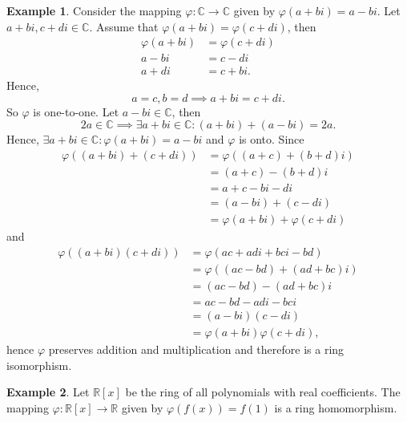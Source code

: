 \documentclass{article}
\theoremstyle{definition}
\newtheorem{example}{Example}[section]
\begin{document}
\begin{example}
    Consider the mapping $\varphi:\mathbb{C}\to\mathbb{C}$ given by $\varphi(a+bi)=a-bi$. Let $a+bi,c+di\in\mathbb{C}$. Assume that $\varphi(a+bi)=\varphi(c+di)$, then
    \begin{align*}
        \varphi(a+bi)&=\varphi(c+di)\\
        a-bi&=c-di\\
        a+di&=c+bi.
    \end{align*}
    Hence,
    \begin{equation*}
        a=c,b=d \implies a+bi=c+di.
    \end{equation*}
    So $\varphi$ is one-to-one. Let $a-bi\in\mathbb{C}$, then 
    \begin{equation*}
        2a\in\mathbb{C} \implies \exists a+bi\in\mathbb{C}:(a+bi)+(a-bi)=2a.
    \end{equation*}
    Hence, $\exists a+bi\in\mathbb{C}:\varphi(a+bi)=a-bi$ and $\varphi$ is onto. Since
    \begin{align*}
        \varphi((a+bi)+(c+di))&=\varphi((a+c)+(b+d)i)\\
        &=(a+c)-(b+d)i\\
        &=a+c-bi-di\\
        &=(a-bi)+(c-di)\\
        &=\varphi(a+bi)+\varphi(c+di)
    \end{align*}
    and
    \begin{align*}
        \varphi((a+bi)(c+di))&=\varphi(ac+adi+bci-bd)\\
        &=\varphi((ac-bd)+(ad+bc)i)\\
        &=(ac-bd)-(ad+bc)i\\
        &=ac-bd-adi-bci\\
        &=(a-bi)(c-di)\\
        &=\varphi(a+bi)\varphi(c+di),
    \end{align*}
    hence $\varphi$ preserves addition and multiplication and therefore is a ring isomorphism.
\end{example}

\begin{example}
    Let $\mathbb{R}[x]$ be the ring of all polynomials with real coefficients. The mapping $\varphi:\mathbb{R}[x]\to\mathbb{R}$ given by $\varphi(f(x))=f(1)$ is a ring homomorphism.
\end{example}
\end{document}
